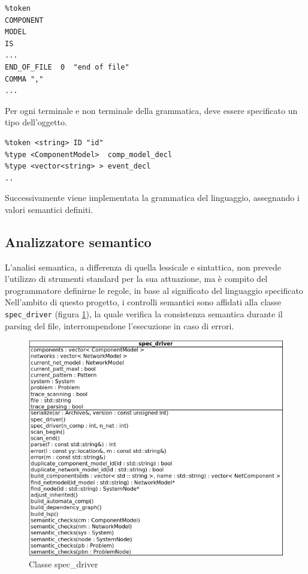 \begin{verbatim}
%token
COMPONENT
MODEL
IS
...
END_OF_FILE  0  "end of file"
COMMA ","
...
\end{verbatim}

Per ogni terminale e non terminale della grammatica, deve essere specificato un tipo dell'oggetto.

\begin{verbatim}
%token <string> ID "id"
%type <ComponentModel>  comp_model_decl
%type <vector<string> > event_decl
..
\end{verbatim}

Successivamente viene implementata la grammatica del linguaggio, assegnando i valori semantici definiti.

\subsection{Analizzatore semantico}
L'analisi semantica, a differenza di quella lessicale e sintattica, non prevede l'utilizzo di strumenti standard per la sua attuazione, ma è compito del programmatore definirne le regole, in base al significato del linguaggio specificato Nell'ambito di questo progetto, i controlli semantici sono affidati alla classe \verb|spec_driver| (figura \ref{fig:driver}), la quale verifica la consistenza semantica durante il parsing del file, interrompendone l'esecuzione in caso di errori. 

\begin{figure}[htbp]
\centering
\includegraphics[scale=0.7]{./Img/implementazione/driver.png}
\caption{Classe spec\_driver}
\label{fig:driver}
\end{figure}

